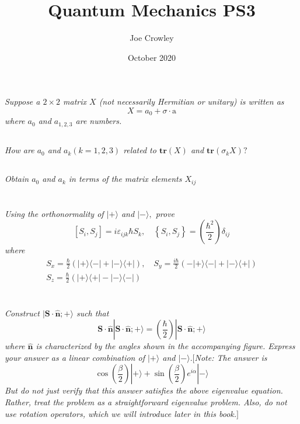 \documentclass{article}
\title{Quantum Mechanics PS3}
\author{Joe Crowley}
\date{October 2020}
\begin{document}
  

\section{}
\textit{Suppose a $2 \times 2$ matrix $X$ (not necessarily Hermitian or unitary) is written as
$$
X=a_{0}+\sigma \cdot \mathrm{a}
$$
where $a_{0}$ and $a_{1,2,3}$ are numbers.}
\subsection{}
\textit{How are $a_{0}$ and $a_{k}(k=1,2,3)$ related to $\mathbf{tr}(X)$ and $\mathbf{tr}\left(\sigma_{k} X\right) ?$}
\subsection{}
\textit{Obtain $a_{0}$ and $a_{k}$ in terms of the matrix elements $X_{i j}$}

\newpage

\section{}
\textit{Using the orthonormality of $|+\rangle$ and $|-\rangle,$ prove
$$
\left[S_{i}, S_{j}\right]=i \varepsilon_{i j k} \hbar S_{k}, \quad\left\{S_{i}, S_{j}\right\}=\left(\frac{\hbar^{2}}{2}\right) \delta_{i j}
$$
where
$$
\begin{array}{l}
S_{x}=\frac{\hbar}{2}(|+\rangle\langle-|+|-\rangle\langle+|), \quad S_{y}=\frac{i \hbar}{2}(-|+\rangle\langle-|+|-\rangle\langle+|) \\
S_{z}=\frac{\hbar}{2}(|+\rangle\langle+|-|-\rangle\langle-|)
\end{array}
$$}


\newpage

\section{}
\textit{Construct $|\mathbf{S} \cdot \hat{\mathbf{n}} ;+\rangle$ such that
$$
\mathbf{S} \cdot \hat{\mathbf{n}}|\mathbf{S} \cdot \hat{\mathbf{n}} ;+\rangle=\left(\frac{\hbar}{2}\right)|\mathbf{S} \cdot \hat{\mathbf{n}} ;+\rangle
$$
where $\hat{\mathbf{n}}$ is characterized by the angles shown in the accompanying figure. Express your answer as a linear combination of $|+\rangle$ and $|-\rangle .[$Note: The answer is
$$
\cos \left(\frac{\beta}{2}\right)|+\rangle+\sin \left(\frac{\beta}{2}\right) e^{i \alpha}|-\rangle
$$
But do not just verify that this answer satisfies the above eigenvalue equation. Rather, treat the problem as a straightforward eigenvalue problem. Also, do not use rotation operators, which we will introduce later in this book.$]$}
\end{document}
